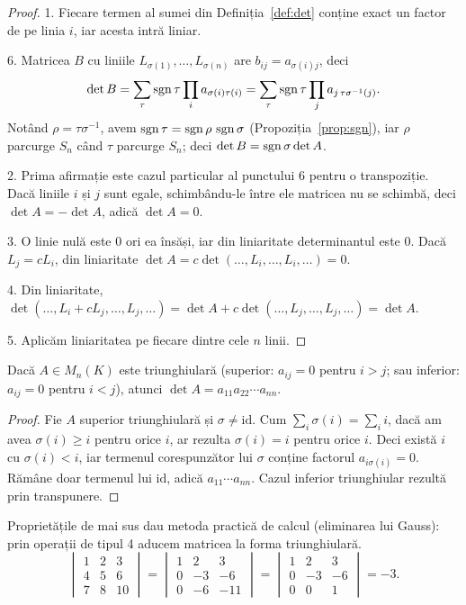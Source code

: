 \begin{proof}
1. Fiecare termen al sumei din Definiția~\ref{def:det} conține exact un factor de pe linia $i$, iar acesta intră liniar.

6. Matricea $B$ cu liniile $L_{\sigma(1)},\dots,L_{\sigma(n)}$ are $b_{ij}=a_{\sigma(i)j}$, deci
\[
\det B=\sum_{\tau}\operatorname{sgn}\tau\prod_i a_{\sigma(i)\tau(i)}=\sum_\tau\operatorname{sgn}\tau\prod_j a_{j\,\tau\sigma^{-1}(j)} .
\]
Notând $\rho=\tau\sigma^{-1}$, avem $\operatorname{sgn}\tau=\operatorname{sgn}\rho\,\operatorname{sgn}\sigma$ (Propoziția~\ref{prop:sgn}), iar $\rho$ parcurge $S_n$ când $\tau$ parcurge $S_n$; deci $\det B=\operatorname{sgn}\sigma\det A$.

2. Prima afirmație este cazul particular al punctului 6 pentru o transpoziție. Dacă liniile $i$ și $j$ sunt egale, schimbându-le între ele matricea nu se schimbă, deci $\det A=-\det A$, adică $\det A=0$.

3. O linie nulă este $0$ ori ea însăși, iar din liniaritate determinantul este $0$. Dacă $L_j=cL_i$, din liniaritate $\det A=c\det(\dots,L_i,\dots,L_i,\dots)=0$.

4. Din liniaritate, $\det(\dots,L_i+cL_j,\dots,L_j,\dots)=\det A+c\det(\dots,L_j,\dots,L_j,\dots)=\det A$.

5. Aplicăm liniaritatea pe fiecare dintre cele $n$ linii.
\end{proof}

\begin{propozitie}\label{prop:dettriunghiulara}
Dacă $A\in M_n(K)$ este triunghiulară (superior: $a_{ij}=0$ pentru $i>j$; sau inferior: $a_{ij}=0$ pentru $i<j$), atunci $\det A=a_{11}a_{22}\cdots a_{nn}$.
\end{propozitie}

\begin{proof}
Fie $A$ superior triunghiulară și $\sigma\neq\mathrm{id}$. Cum $\sum_i\sigma(i)=\sum_i i$, dacă am avea $\sigma(i)\ge i$ pentru orice $i$, ar rezulta $\sigma(i)=i$ pentru orice $i$. Deci există $i$ cu $\sigma(i)<i$, iar termenul corespunzător lui $\sigma$ conține factorul $a_{i\sigma(i)}=0$. Rămâne doar termenul lui $\mathrm{id}$, adică $a_{11}\cdots a_{nn}$. Cazul inferior triunghiular rezultă prin transpunere.
\end{proof}

\begin{exemplu}
Proprietățile de mai sus dau metoda practică de calcul (eliminarea lui Gauss): prin operații de tipul 4 aducem matricea la forma triunghiulară.
\[
\begin{vmatrix}1&2&3\\4&5&6\\7&8&10\end{vmatrix}
=\begin{vmatrix}1&2&3\\0&-3&-6\\0&-6&-11\end{vmatrix}
=\begin{vmatrix}1&2&3\\0&-3&-6\\0&0&1\end{vmatrix}=-3 .
\]
\end{exemplu}

